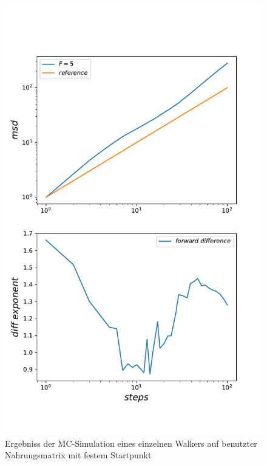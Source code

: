 \documentclass[a4paper, 12pt]{scrartcl}
\begin{document}
\begin{figure}[H]
	\centering
	\includegraphics[scale=0.7]{single_walker_on_used_mat_nodisorderavg.pdf}
	\caption{Ergebniss der MC-Simulation eines einzelnen Walkers auf benutzter Nahrungsmatrix mit festem Startpunkt}
\end{figure}
\newpage
\end{document}
